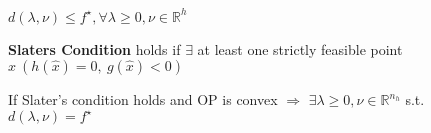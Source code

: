 


\begin{proposition}
	$d(\lambda,\nu)\le f^\star,\forall\lambda\ge0,\nu\in\mathbb{R}^{h}$
\end{proposition}

\begin{definition}
	\textbf{Slaters Condition} holds if $\exists$
	at least one
	strictly feasible point
	$\hat{x}{\ (h(\hat{x})=0,\ g(\hat{x})<0)}$
\end{definition}


\begin{proposition}
	If Slater's condition holds
	and OP is convex
	$\Rightarrow$
	$\exists \lambda \ge 0, \nu \in \mathbb{R}^{n_h}$ s.t. $d(\lambda,\nu)=f^\star$
\end{proposition}



